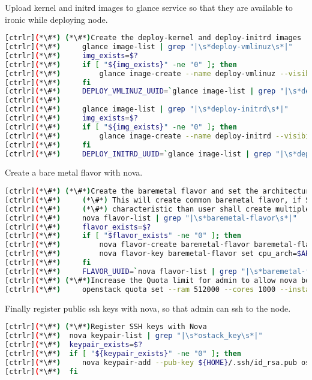Upload kernel and initrd images to glance service so that they are available to ironic while deploying node.

\begin{lstlisting}[language=bash,keywords={}]
[ctrlr](*\#*) (*\#*)Create the deploy-kernel and deploy-initrd images
[ctrlr](*\#*)     glance image-list | grep "|\s*deploy-vmlinuz\s*|"
[ctrlr](*\#*)     img_exists=$?
[ctrlr](*\#*)     if [ "${img_exists}" -ne "0" ]; then
[ctrlr](*\#*)         glance image-create --name deploy-vmlinuz --visibility public --disk-format aki --container-format aki < ${chpc_image_deploy_kernel}
[ctrlr](*\#*)     fi
[ctrlr](*\#*)     DEPLOY_VMLINUZ_UUID=`glance image-list | grep "|\s*deploy-vmlinuz\s*|" | awk '{print $2}'`
[ctrlr](*\#*) 
[ctrlr](*\#*)     glance image-list | grep "|\s*deploy-initrd\s*|"
[ctrlr](*\#*)     img_exists=$?
[ctrlr](*\#*)     if [ "${img_exists}" -ne "0" ]; then
[ctrlr](*\#*)         glance image-create --name deploy-initrd --visibility public --disk-format ari --container-format ari < ${chpc_image_deploy_ramdisk}
[ctrlr](*\#*)     fi
[ctrlr](*\#*)     DEPLOY_INITRD_UUID=`glance image-list | grep "|\s*deploy-initrd\s*|" | awk '{print $2}
\end{lstlisting}

Create a bare metal flavor with nova.

\begin{lstlisting}[language=bash,keywords={}]
[ctrlr](*\#*) (*\#*)Create the baremetal flavor and set the architecture to x86_64
[ctrlr](*\#*)     (*\#*) This will create common baremetal flavor, if SMS node & compute has different
[ctrlr](*\#*)     (*\#*) characteristic than user shall create multiple flavor one each characterisitc
[ctrlr](*\#*)     nova flavor-list | grep "|\s*baremetal-flavor\s*|"
[ctrlr](*\#*)     flavor_exists=$?
[ctrlr](*\#*)     if [ "$flavor_exists" -ne "0" ]; then
[ctrlr](*\#*)         nova flavor-create baremetal-flavor baremetal-flavor ${RAM_MB} ${DISK_GB} ${CPU}
[ctrlr](*\#*)         nova flavor-key baremetal-flavor set cpu_arch=$ARCH
[ctrlr](*\#*)     fi
[ctrlr](*\#*)     FLAVOR_UUID=`nova flavor-list | grep "|\s*baremetal-flavor\s*|" | awk '{print $2}'`
[ctrlr](*\#*) (*\#*)Increase the Quota limit for admin to allow nova boot
[ctrlr](*\#*)     openstack quota set --ram 512000 --cores 1000 --instances 100 admin
\end{lstlisting}

Finally register public ssh keys with nova, so that admin can ssh to the node.

\begin{lstlisting}[language=bash,keywords={}]
[ctrlr](*\#*) (*\#*)Register SSH keys with Nova
[ctrlr](*\#*)  nova keypair-list | grep "|\s*ostack_key\s*|"
[ctrlr](*\#*)  keypair_exists=$?
[ctrlr](*\#*)  if [ "${keypair_exists}" -ne "0" ]; then
[ctrlr](*\#*)     nova keypair-add --pub-key ${HOME}/.ssh/id_rsa.pub ostack_key
[ctrlr](*\#*)  fi
\end{lstlisting}


